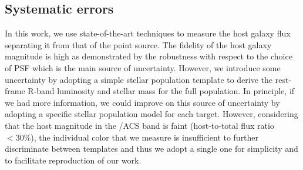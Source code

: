 \documentclass[apj]{emulateapj}
\begin{document}
%

\subsection{Systematic errors}

In this work, we use state-of-the-art techniques to measure the host galaxy flux separating it from that of the point source. The fidelity of the host galaxy magnitude is high as demonstrated by the robustness with respect to the choice of PSF which is the main source of uncertainty. However, we introduce some uncertainty by adopting a simple stellar population template to derive the rest-frame R-band luminosity and stellar mass for the full population. In principle, if we had more information, we could improve on this source of uncertainty by adopting a specific stellar population model for each target. However, considering that the host magnitude in the \hst/ACS band is faint (host-to-total flux ratio $< 30\%$), the individual color that we measure is insufficient to further discriminate between templates and thus we adopt a single one for simplicity and to facilitate reproduction of our work.
\end{document}
